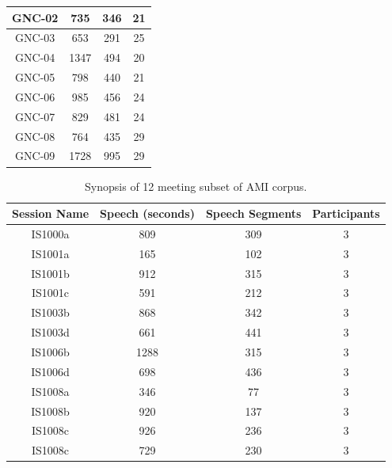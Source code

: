 \documentclass[journal,10pt]{IEEEtran}
\begin{document}
\begin{table}[t]
{\begin{tabular}{|c|c|c|c|}
		GNC-02       & 735              & 346             & 21           \\ \hline
		GNC-03       & 653              & 291             & 25           \\ \hline
		GNC-04       & 1347             & 494             & 20           \\ \hline
		GNC-05       & 798              & 440             & 21           \\ \hline
		GNC-06       & 985              & 456             & 24           \\ \hline
		GNC-07       & 829              & 481             & 24           \\ \hline
		GNC-08       & 764              & 435             & 29           \\ \hline
		GNC-09       & 1728             & 995             & 29           \\ \hline
	\end{tabular}}
\end{table}
\begin{table}[]
	\centering
	\caption{Synopsis of 12 meeting subset of AMI corpus.}
	\label{ami}
	\begin{tabular}{|c|c|c|c|}
		\hline
		Session Name & Speech (seconds) & Speech Segments & Participants \\ \hline
		IS1000a & 809 & 309 & 3 \\ \hline
		IS1001a & 165 & 102 & 3 \\ \hline
		IS1001b & 912 & 315 & 3 \\ \hline
		IS1001c & 591 & 212 & 3 \\ \hline
		IS1003b & 868 & 342 & 3 \\ \hline
		IS1003d & 661 & 441 & 3 \\ \hline
		IS1006b & 1288 & 315 & 3 \\ \hline
		IS1006d & 698 & 436 & 3 \\ \hline
		IS1008a & 346 & 77 & 3 \\ \hline
		IS1008b & 920 & 137 & 3 \\ \hline
		IS1008c & 926 & 236 & 3 \\ \hline
		IS1008c & 729 & 230 & 3 \\ \hline
	\end{tabular}
\end{table}
\end{document}
